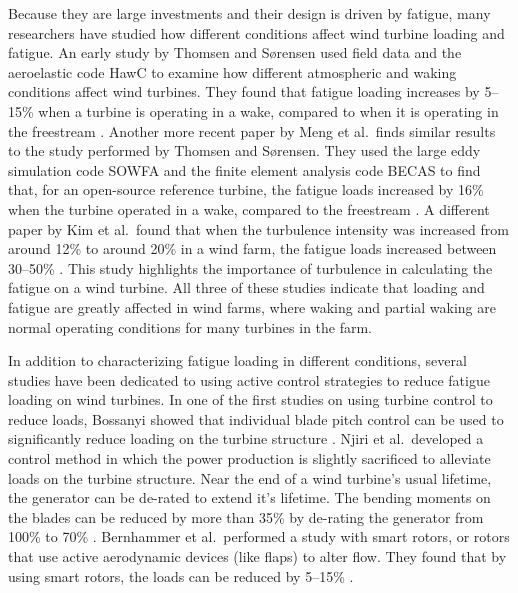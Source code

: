 \documentclass[11pt,letterpaper]{article}
\begin{document}
Because they are large investments and their design is driven by fatigue, many researchers have studied how different conditions affect wind turbine loading and fatigue.
% 
An early study by Thomsen and S{\o}rensen used field data and the aeroelastic code HawC to examine how different atmospheric and waking conditions affect wind turbines. They found that fatigue loading increases by 5--15\% when a turbine is operating in a wake, compared to when it is operating in the freestream \cite{thomsen1999fatigue}.
% 
Another more recent paper by Meng et al.~finds similar results to the study performed by Thomsen and S{\o}rensen. They used the large eddy simulation code SOWFA and the finite element analysis code BECAS to find that, for an open-source reference turbine, the fatigue loads increased by 16\% when the turbine operated in a wake, compared to the freestream \cite{meng2019study}.
% 
A different paper by Kim et al.~found that when the turbulence intensity was increased from around 12\% to around 20\% in a wind farm, the fatigue loads increased between 30--50\% \cite{kim2015study}. This study highlights the importance of turbulence in calculating the fatigue on a wind turbine. All three of these studies indicate that loading and fatigue are greatly affected in wind farms, where waking and partial waking are normal operating conditions for many turbines in the farm.


In addition to characterizing fatigue loading in different conditions, several studies have been dedicated to using active control strategies to reduce fatigue loading on wind turbines. 
% 
In one of the first studies on using turbine control to reduce loads, Bossanyi showed that individual blade pitch control can be used to significantly reduce loading on the turbine structure \cite{bossanyi2003individual}.
% 
Njiri et al.~developed a control method in which the power production is slightly sacrificed to alleviate loads on the turbine structure. Near the end of a wind turbine's usual lifetime, the generator can be de-rated to extend it's lifetime. The bending moments on the blades can be reduced by more than 35\% by de-rating the generator from 100\% to 70\% \cite{njiri2019consideration}.
% 
Bernhammer et al.~performed a study with smart rotors, or rotors that use active aerodynamic devices (like flaps) to alter flow. They found that by using smart rotors, the loads can be reduced by 5--15\% \cite{bernhammer2016fatigue}.
\end{document}
